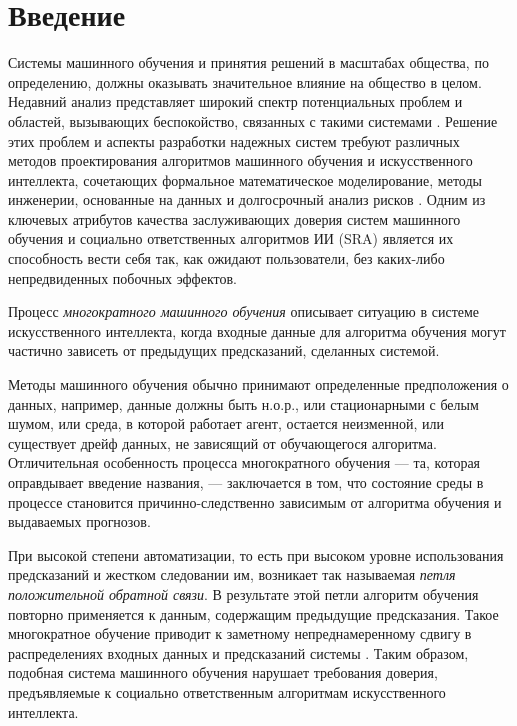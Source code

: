 \section{Введение}

Системы машинного обучения и принятия решений в масштабах общества, по определению, должны оказывать значительное влияние на общество в целом. Недавний анализ \cite{cais2023statementairisk} представляет широкий спектр потенциальных проблем и областей, вызывающих беспокойство, связанных с такими системами \cite{suresh2020misplaced}. Решение этих проблем и  аспекты разработки надежных систем \cite{li2023trustworthy} требуют различных методов проектирования алгоритмов машинного обучения и искусственного интеллекта, сочетающих формальное математическое моделирование, методы инженерии, основанные на данных и долгосрочный анализ рисков \cite{sifakis2023trustworthy, pei2022requirements, he2021challenges}. Одним из ключевых атрибутов качества заслуживающих доверия систем машинного обучения \cite{serban2021practices,toreini2020relationship,siebert2020towards} и социально ответственных алгоритмов ИИ (SRA)\cite{cheng2021socially} является их способность вести себя так, как ожидают пользователи, без каких-либо непредвиденных побочных эффектов.

Процесс \emph{многократного машинного обучения} описывает ситуацию в системе искусственного интеллекта, когда входные данные для алгоритма обучения могут частично зависеть от предыдущих предсказаний, сделанных системой. 

Методы машинного обучения обычно принимают определенные предположения о данных, например, данные должны быть н.о.р., или стационарными с белым шумом, или среда, в которой работает агент, остается неизменной, или существует дрейф данных, не зависящий от обучающегося алгоритма. Отличительная особенность процесса многократного обучения --- та, которая оправдывает введение названия, --- заключается в том, что состояние среды в процессе становится причинно-следственно зависимым от алгоритма обучения и выдаваемых прогнозов. 
    
При высокой степени автоматизации, то есть при высоком уровне использования предсказаний и жестком следовании им, возникает так называемая \emph{петля положительной обратной связи}. В результате этой петли алгоритм обучения повторно применяется к данным, содержащим предыдущие предсказания. Такое многократное обучение приводит к заметному непреднамеренному сдвигу в распределениях входных данных и предсказаний системы \citep{khritankov2023positive}. Таким образом, подобная система машинного обучения нарушает требования доверия, предъявляемые к социально ответственным алгоритмам искусственного интеллекта. 

